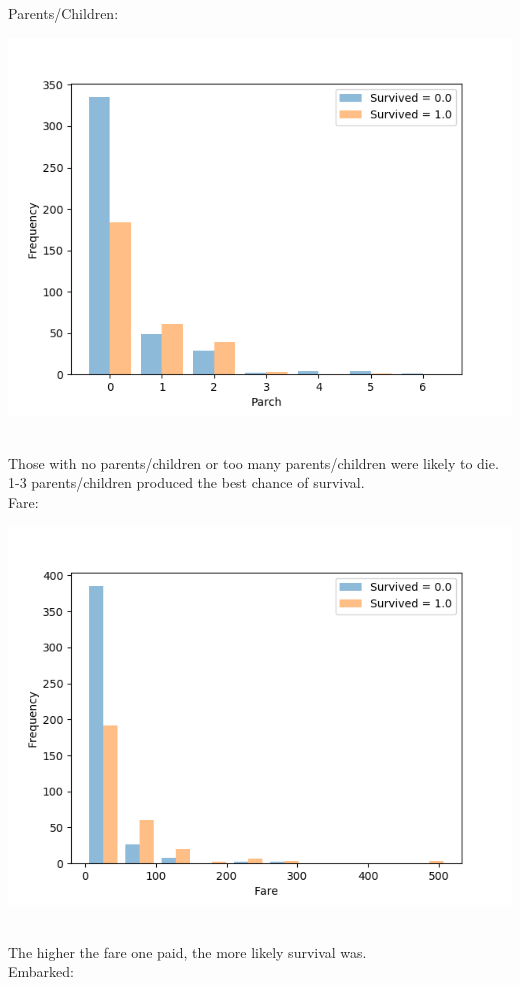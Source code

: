 \documentclass[11pt]{article}
\begin{document}
\begin{enumerate}
\newpage
Parents/Children: \\
\centerline{\includegraphics[scale=0.5]{5}} \\
Those with no parents/children or too many parents/children were likely to die. 1-3 parents/children produced the best chance of survival. \\
Fare: \\
\centerline{\includegraphics[scale=0.5]{6}} \\
The higher the fare one paid, the more likely survival was. \\
\newpage
Embarked: \\

\end{enumerate}
\end{document}
